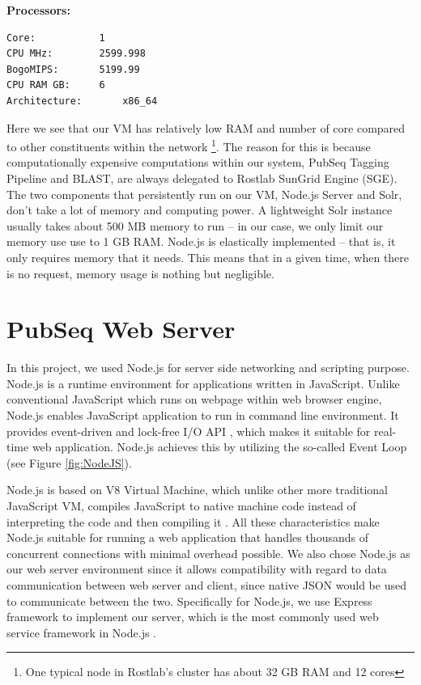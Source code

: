 \textbf{Processors:}
\begin{lstlisting}[breaklines]
Core:			1
CPU MHz:		2599.998
BogoMIPS:		5199.99
CPU RAM GB:		6
Architecture:		x86_64
\end{lstlisting}

Here we see that our VM has relatively low RAM and number of core compared to other constituents within the network \footnote{One typical node in Rostlab's cluster has about 32 GB RAM and 12 cores}. The reason for this is because computationally expensive computations within our system, PubSeq Tagging Pipeline and BLAST, are always delegated to Rostlab SunGrid Engine (SGE). The two components that persistently run on our VM, Node.js Server and Solr, don't take a lot of memory and computing power. A lightweight Solr instance usually takes about 500 MB memory to run -- in our case, we only limit our memory use use to 1 GB RAM. Node.js is elastically implemented -- that is, it only requires memory that it needs. This means that in a given time, when there is no request, memory usage is nothing but negligible.

\section{PubSeq Web Server}

In this project, we used Node.js for server side networking and scripting purpose. Node.js is a runtime environment for applications written in JavaScript. Unlike conventional JavaScript which runs on webpage within web browser engine, Node.js enables JavaScript application to run in command line environment. It provides event-driven and lock-free I/O API \citep{nodejs}, which makes it suitable for real-time web application. Node.js achieves this by utilizing the so-called Event Loop (see Figure \ref{fig:NodeJS}). 


Node.js is based on V8 Virtual Machine, which unlike other more traditional JavaScript VM, compiles JavaScript to native machine code instead of interpreting the code and then compiling it \citep{v8javascript}. All these characteristics make Node.js suitable for running a web application that handles thousands of concurrent connections with minimal overhead possible. We also chose Node.js as our web server environment since it allows compatibility with regard to data communication between web server and client, since native JSON would be used to communicate between the two. Specifically for Node.js, we use Express framework to implement our server, which is the most commonly used web service framework in Node.js \citep{expressjs}.


